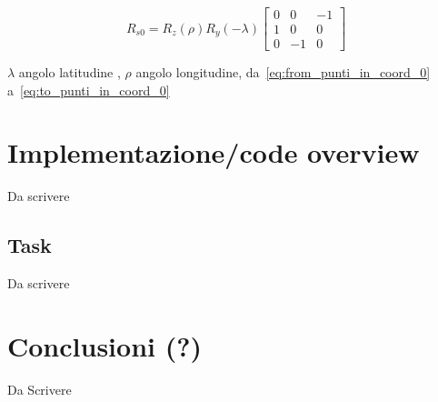\begin{equation}
R_{s0} = R_z (\rho)  R_y (-\lambda)  \begin{bmatrix}
0 & 0 & -1\\
1 & 0 & 0\\
0 & -1 & 0
\end{bmatrix}
\label{eq:proiezione}
\end{equation}




$\lambda$ angolo latitudine , $\rho $ angolo longitudine, da~\ref{eq:from_punti_in_coord_0}  a~\ref{eq:to_punti_in_coord_0}


\section{Implementazione/code overview}
Da scrivere
\subsection{Task}
Da scrivere

\section{Conclusioni (?)}
Da Scrivere

	
